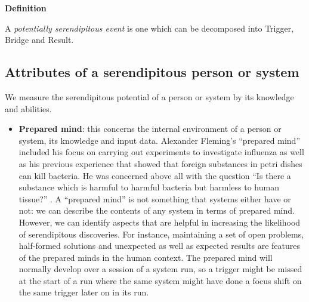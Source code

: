 \begin{mdframed}
{\bf Definition}

A {\em potentially serendipitous event} is one which can be decomposed
into Trigger, Bridge and Result.
\end{mdframed}


\subsection{Attributes of a serendipitous person or
  system}\label{discoverer}
We measure the serendipitous potential of a person or system by its
knowledge and abilities. 

\begin{itemize}
\item \textbf{Prepared mind}: this concerns the internal environment
  of a person or system, its knowledge and input data. Alexander
  Fleming's ``prepared mind'' included his focus on carrying out
  experiments to investigate influenza as well as his previous
  experience that showed that foreign substances in petri dishes can
  kill bacteria.  He was concerned above all with the question ``Is
  there a substance which is harmful to harmful bacteria but harmless
  to human tissue?''  \cite[p. 161]{roberts}. A ``prepared mind'' is
  not something that systems either have or not: we can describe the
  contents of any system in terms of prepared mind. However, we can
  identify aspects that are helpful in increasing the likelihood of
  serendipitous discoveries. For instance, maintaining a set of open
  problems, half-formed solutions and unexpected as well as expected
  results are features of the prepared minds in the human context. The
  prepared mind will normally develop over a session of a system run,
  so a trigger might be missed at the start of a run where the same
  system might have done a focus shift on the same trigger later on in
  its run.
\end{itemize}


